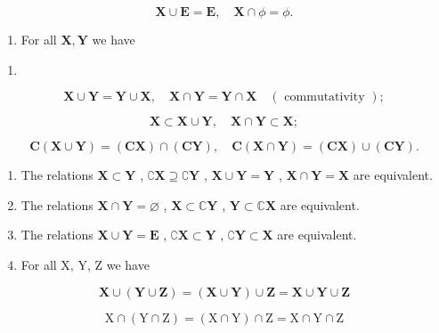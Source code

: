 \[
\mathbf {X} \cup \mathbf {E} = \mathbf {E}, \quad \mathbf {X} \cap \phi = \phi .
\]

\begin{enumerate}
\def\labelenumi{(\alph{enumi})}
\setcounter{enumi}{2}
\tightlist
\item
  For all \(\mathbf{X},\mathbf{Y}\) we have
\end{enumerate}

\begin{enumerate}
\def\labelenumi{(\arabic{enumi})}
\setcounter{enumi}{5}
\tightlist
\item
\end{enumerate}

\[
\mathbf {X} \cup \mathbf {Y} = \mathbf {Y} \cup \mathbf {X}, \quad \mathbf {X} \cap \mathbf {Y} = \mathbf {Y} \cap \mathbf {X} \quad (\text { commutativity });\tag{7}
\]

\[
\mathbf {X} \subset \mathbf {X} \cup \mathbf {Y}, \quad \mathbf {X} \cap \mathbf {Y} \subset \mathbf {X};\tag{8}
\]

\[
\mathbf {C} (\mathbf {X} \cup \mathbf {Y}) = (\mathbf {C X}) \cap (\mathbf {C Y}), \quad \mathbf {C} (\mathbf {X} \cap \mathbf {Y}) = (\mathbf {C X}) \cup (\mathbf {C Y}).
\]

\begin{enumerate}
\def\labelenumi{(\alph{enumi})}
\setcounter{enumi}{3}
\item
  The relations \(\mathbf{X} \subset \mathbf{Y}\) , \(\complement \mathbf{X} \supseteq \complement \mathbf{Y}\) , \(\mathbf{X} \cup \mathbf{Y} = \mathbf{Y}\) , \(\mathbf{X} \cap \mathbf{Y} = \mathbf{X}\) are equivalent.
\item
  The relations \(\mathbf{X} \cap \mathbf{Y} = \varnothing\) , \(\mathbf{X} \subset \mathbb{C}\mathbf{Y}\) , \(\mathbf{Y} \subset \mathbb{C}\mathbf{X}\) are equivalent.
\item
  The relations \(\mathbf{X} \cup \mathbf{Y} = \mathbf{E}\) , \(\complement \mathbf{X} \subset \mathbf{Y}\) , \(\complement \mathbf{Y} \subset \mathbf{X}\) are equivalent.
\item
  For all X, Y, Z we have
\end{enumerate}

\[
\mathbf {X} \cup (\mathbf {Y} \cup \mathbf {Z}) = (\mathbf {X} \cup \mathbf {Y}) \cup \mathbf {Z} = \mathbf {X} \cup \mathbf {Y} \cup \mathbf {Z}\tag{9}
\]

\[
\mathrm{X} \cap (\mathrm{Y} \cap \mathrm{Z}) = (\mathrm{X} \cap \mathrm{Y}) \cap \mathrm{Z} = \mathrm{X} \cap \mathrm{Y} \cap \mathrm{Z}\tag{10}
\]

